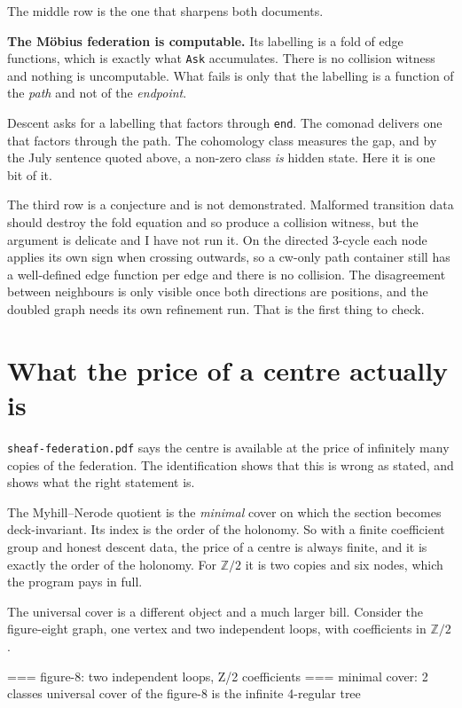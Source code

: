 \documentclass[11pt,a4paper]{article}
\begin{document}
The middle row is the one that sharpens both documents.

\begin{alarmbox}
\textbf{The M\"obius federation is computable.} Its labelling is a fold of edge
functions, which is exactly what \verb|Ask| accumulates. There is no collision
witness and nothing is uncomputable. What fails is only that the labelling is a
function of the \emph{path} and not of the \emph{endpoint}.

Descent asks for a labelling that factors through \verb|end|. The comonad
delivers one that factors through the path. The cohomology class measures the
gap, and by the July sentence quoted above, a non-zero class \emph{is} hidden
state. Here it is one bit of it.
\end{alarmbox}

The third row is a conjecture and is not demonstrated. Malformed transition data
should destroy the fold equation and so produce a collision witness, but the
argument is delicate and I have not run it. On the directed 3-cycle each node
applies its own sign when crossing outwards, so a cw-only path container still
has a well-defined edge function per edge and there is no collision. The
disagreement between neighbours is only visible once both directions are
positions, and the doubled graph needs its own refinement run. That is the first
thing to check.

\section{What the price of a centre actually is}

\texttt{sheaf-federation.pdf} says the centre is available at the price of
infinitely many copies of the federation. The identification shows that this is
wrong as stated, and shows what the right statement is.

The Myhill--Nerode quotient is the \emph{minimal} cover on which the section
becomes deck-invariant. Its index is the order of the holonomy. So with a finite
coefficient group and honest descent data, the price of a centre is always
finite, and it is exactly the order of the holonomy. For $\mathbb{Z}/2$ it is
two copies and six nodes, which the program pays in full.

The universal cover is a different object and a much larger bill. Consider the
figure-eight graph, one vertex and two independent loops, with coefficients in
$\mathbb{Z}/2$.

\begin{term}
=== figure-8: two independent loops, Z/2 coefficients ===
  minimal cover: 2 classes
  universal cover of the figure-8 is the infinite 4-regular tree
\end{term}
\end{document}
